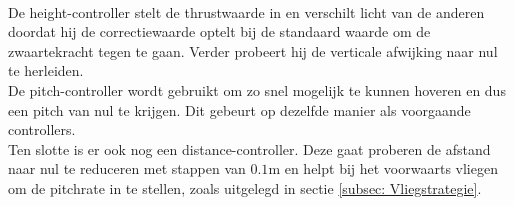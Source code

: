 \\
De height-controller stelt de thrustwaarde in en verschilt licht van de anderen doordat hij de correctiewaarde optelt bij de standaard waarde om de zwaartekracht tegen te gaan. Verder probeert hij de verticale afwijking naar nul te herleiden.
\\
De pitch-controller wordt gebruikt om zo snel mogelijk te kunnen hoveren en dus een pitch van nul te krijgen. Dit gebeurt op dezelfde manier als voorgaande controllers.
\\
Ten slotte is er ook nog een distance-controller. Deze gaat proberen de afstand naar nul te reduceren met stappen van \(0.1\)m en helpt bij het voorwaarts vliegen om de pitchrate in te stellen, zoals uitgelegd in sectie \ref{subsec: Vliegstrategie}.